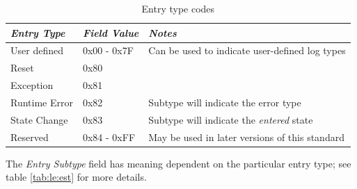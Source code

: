 \documentclass[paper=letter, fontsize=10pt]{scrartcl} %
\numberwithin{equation}{section} %
\numberwithin{figure}{section} %
\numberwithin{table}{section} %
\begin{document}
\begin{table}[ht!]
    \begin{center}
        \begin{tabularx}{\textwidth}{|l|l|X|}
            \hline
            \emph{Entry Type} & \emph{Field Value} & \emph{Notes}                                   \\ \hline
            User defined      & 0x00 - 0x7F        & Can be used to indicate user-defined log types \\ \hline
            Reset             & 0x80               &                                                \\ \hline
            Exception         & 0x81               &                                                \\ \hline
            Runtime Error     & 0x82               & Subtype will indicate the error type           \\ \hline
            State Change      & 0x83               & Subtype will indicate the \emph{entered} state \\ \hline
            Reserved          & 0x84 - 0xFF        & May be used in later versions of this standard \\ \hline
        \end{tabularx}
        \caption{Entry type codes}
        \label{tab:le:et}
    \end{center}
\end{table}

The \emph{Entry Subtype} field has meaning dependent on the particular entry type;
see table \ref{tab:le:est} for more details.
\end{document}
